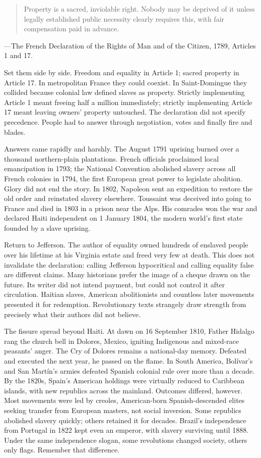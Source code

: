 \begin{quote}
Property is a sacred, inviolable right. Nobody may be deprived of it unless legally established public necessity clearly requires this, with fair compensation paid in advance.
\end{quote}
---The French Declaration of the Rights of Man and of the Citizen, 1789, Articles 1 and 17.

Set them side by side. Freedom and equality in Article 1; sacred property in Article 17. In metropolitan France they could coexist. In Saint-Domingue they collided because colonial law defined slaves as property. Strictly implementing Article 1 meant freeing half a million immediately; strictly implementing Article 17 meant leaving owners' property untouched. The declaration did not specify precedence. People had to answer through negotiation, votes and finally fire and blades.

Answers came rapidly and harshly. The August 1791 uprising burned over a thousand northern-plain plantations. French officials proclaimed local emancipation in 1793; the National Convention abolished slavery across all French colonies in 1794, the first European great power to legislate abolition. Glory did not end the story. In 1802, Napoleon sent an expedition to restore the old order and reinstated slavery elsewhere. Toussaint was deceived into going to France and died in 1803 in a prison near the Alps. His comrades won the war and declared Haiti independent on 1 January 1804, the modern world's first state founded by a slave uprising.

Return to Jefferson. The author of equality owned hundreds of enslaved people over his lifetime at his Virginia estate and freed very few at death. This does not invalidate the declaration: calling Jefferson hypocritical and calling equality false are different claims. Many historians prefer the image of a cheque drawn on the future. Its writer did not intend payment, but could not control it after circulation. Haitian slaves, American abolitionists and countless later movements presented it for redemption. Revolutionary texts strangely draw strength from precisely what their authors did not believe.

The fissure spread beyond Haiti. At dawn on 16 September 1810, Father Hidalgo rang the church bell in Dolores, Mexico, igniting Indigenous and mixed-race peasants' anger. The Cry of Dolores remains a national-day memory. Defeated and executed the next year, he passed on the flame. In South America, Bolívar's and San Martín's armies defeated Spanish colonial rule over more than a decade. By the 1820s, Spain's American holdings were virtually reduced to Caribbean islands, with new republics across the mainland. Outcomes differed, however. Most movements were led by creoles, American-born Spanish-descended elites seeking transfer from European masters, not social inversion. Some republics abolished slavery quickly; others retained it for decades. Brazil's independence from Portugal in 1822 kept even an emperor, with slavery surviving until 1888. Under the same independence slogan, some revolutions changed society, others only flags. Remember that difference.


